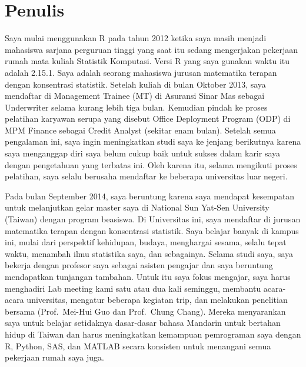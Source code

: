 \documentclass[
]{book}
\begin{document}
\hypertarget{penulis}{%
\section*{Penulis}\label{penulis}}

Saya mulai menggunakan R pada tahun 2012 ketika saya masih menjadi mahasiswa sarjana perguruan tinggi yang saat itu sedang mengerjakan pekerjaan rumah mata kuliah Statistik Komputasi. Versi R yang saya gunakan waktu itu adalah 2.15.1. Saya adalah seorang mahasiswa jurusan matematika terapan dengan konsentrasi statistik. Setelah kuliah di bulan Oktober 2013, saya mendaftar di Management Trainee (MT) di Asuransi Sinar Mas sebagai Underwriter selama kurang lebih tiga bulan. Kemudian pindah ke proses pelatihan karyawan serupa yang disebut Office Deployment Program (ODP) di MPM Finance sebagai Credit Analyst (sekitar enam bulan). Setelah semua pengalaman ini, saya ingin meningkatkan studi saya ke jenjang berikutnya karena saya menganggap diri saya belum cukup baik untuk sukses dalam karir saya dengan pengetahuan yang terbatas ini. Oleh karena itu, selama mengikuti proses pelatihan, saya selalu berusaha mendaftar ke beberapa universitas luar negeri.

Pada bulan September 2014, saya beruntung karena saya mendapat kesempatan untuk melanjutkan gelar master saya di National Sun Yat-Sen University (Taiwan) dengan program beasiswa. Di Universitas ini, saya mendaftar di jurusan matematika terapan dengan konsentrasi statistik. Saya belajar banyak di kampus ini, mulai dari perspektif kehidupan, budaya, menghargai sesama, selalu tepat waktu, menambah ilmu statistika saya, dan sebagainya. Selama studi saya, saya bekerja dengan profesor saya sebagai asisten pengajar dan saya beruntung mendapatkan tunjangan tambahan. Untuk itu saya fokus mengajar, saya harus menghadiri Lab meeting kami satu atau dua kali seminggu, membantu acara-acara universitas, mengatur beberapa kegiatan trip, dan melakukan penelitian bersama (Prof.~Mei-Hui Guo dan Prof.~Chung Chang). Mereka menyarankan saya untuk belajar setidaknya dasar-dasar bahasa Mandarin untuk bertahan hidup di Taiwan dan harus meningkatkan kemampuan pemrograman saya dengan R, Python, SAS, dan MATLAB secara konsisten untuk menangani semua pekerjaan rumah saya juga.
\end{document}
